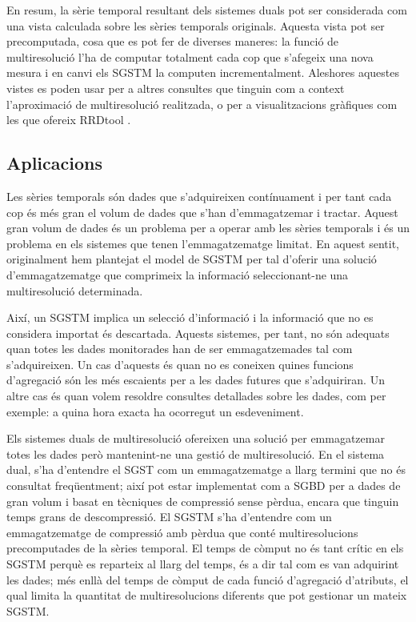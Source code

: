 En resum, la sèrie temporal resultant dels sistemes duals pot ser
considerada com una vista calculada sobre les sèries temporals
originals. Aquesta vista pot ser precomputada, cosa que es pot fer de
diverses maneres: la funció de multiresolució l'ha de computar
totalment cada cop que s'afegeix una nova mesura i en canvi els
\gls{SGSTM} la computen incrementalment.  Aleshores aquestes vistes es
poden usar per a altres consultes que tinguin com a context
l'aproximació de multiresolució realitzada, o per a visualitzacions
gràfiques com les que ofereix RRDtool \cite{rrdtool}.




\subsection{Aplicacions}


Les sèries temporals són dades que s'adquireixen contínuament i per
tant cada cop és més gran el volum de dades que s'han d'emmagatzemar i
tractar. Aquest gran volum de dades és un problema per a operar amb
les sèries temporals i és un problema en els sistemes que tenen
l'emmagatzematge limitat. En aquest sentit, originalment hem
plantejat el model de \gls{SGSTM} per tal d'oferir una solució
d'emmagatzematge que comprimeix la informació seleccionant-ne una
multiresolució determinada.


Així, un \gls{SGSTM} implica un selecció d'informació i la informació
que no es considera importat és descartada. Aquests sistemes, per
tant, no són adequats quan totes les dades monitorades han de ser
emmagatzemades tal com s'adquireixen. Un cas d'aquests és quan no es
coneixen quines funcions d'agregació són les més escaients per a les
dades futures que s'adquiriran. Un altre cas és quan volem resoldre
consultes detallades sobre les dades, com per exemple: a quina hora
exacta ha ocorregut un esdeveniment.


Els sistemes duals de multiresolució ofereixen una solució per
emmagatzemar totes les dades però mantenint-ne una gestió de
multiresolució.  En el sistema dual, s'ha d'entendre el \gls{SGST} com
un emmagatzematge a llarg termini que no és consultat freqüentment;
així pot estar implementat com a \gls{SGBD} per a dades de gran volum
i basat en tècniques de compressió sense pèrdua, encara que tinguin
temps grans de descompressió. El \gls{SGSTM} s'ha d'entendre com un
emmagatzematge de compressió amb pèrdua que conté multiresolucions
precomputades de la sèries temporal.  El temps de còmput no és tant
crític en els \gls{SGSTM} perquè es reparteix al llarg del temps, és a
dir tal com es van adquirint les dades; més enllà del temps de còmput
de cada funció d'agregació d'atributs, el qual limita la quantitat de
multiresolucions diferents que pot gestionar un mateix \gls{SGSTM}.


